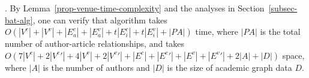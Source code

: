 













.
%
By Lemma~\ref{prop-venue-time-complexity} and the analyses in Section~\ref{subsec-bat-alg}, one can verify that algorithm \batensemble takes $O(|V^c|+|V^v|+|E^c_a|+|E^v_a|+t|E^c_i|+t|E^v_i|+|PA|)$ time, where $|PA|$ is the total number of author-article relationships, and takes $O(7|V^c|+2|V^c{'}|+4|V^v|+2|V^v{'}|+|E^c|+|E^c{'}|+|E^v|+|E^v{'}|+2|A|+|D|)$ space, where $|A|$ is the number of authors and $|D|$ is the size of academic graph data $D$.

